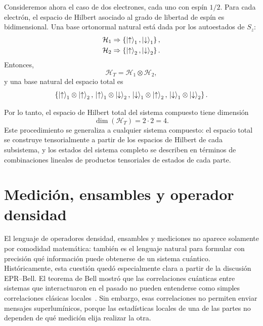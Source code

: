 \documentclass[12pt,a4paper]{article}
\theoremstyle{definition}
\theoremstyle{plain}
\theoremstyle{remark}
\newcommand{\Hil}{\mathcal{H}}
\begin{document}
Consideremos ahora el caso de dos electrones, cada uno con espín $1/2$. Para cada electrón, el espacio de Hilbert asociado al grado de libertad de espín es bidimensional. Una base ortonormal natural está dada por los autoestados de $S_z$:
\begin{align*}
    \Hil_1 &\Rightarrow \left\{\ket{\uparrow}_1,\ket{\downarrow}_1\right\},\\
    \Hil_2 &\Rightarrow \left\{\ket{\uparrow}_2,\ket{\downarrow}_2\right\}.
\end{align*}
Entonces,
\begin{equation*}
    \Hil_T=\Hil_1\otimes\Hil_2,
\end{equation*}
y una base natural del espacio total es
\begin{equation*}
    \left\{
        \ket{\uparrow}_1\otimes\ket{\uparrow}_2,\,
        \ket{\uparrow}_1\otimes\ket{\downarrow}_2,\,
        \ket{\downarrow}_1\otimes\ket{\uparrow}_2,\,
        \ket{\downarrow}_1\otimes\ket{\downarrow}_2
    \right\}.
\end{equation*}

Por lo tanto, el espacio de Hilbert total del sistema compuesto tiene dimensión
\begin{equation*}
    \dim(\Hil_T)=2\cdot 2=4.
\end{equation*}
Este procedimiento se generaliza a cualquier sistema compuesto: el espacio total se construye tensorialmente a partir de los espacios de Hilbert de cada subsistema, y los estados del sistema completo se describen en términos de combinaciones lineales de productos tensoriales de estados de cada parte.
\newpage


\section{Medición, ensambles y \textbf{operador densidad}}


El lenguaje de operadores densidad, ensambles y mediciones no aparece solamente por comodidad matemática: también es el lenguaje natural para formular con precisión qué información puede obtenerse de un sistema cuántico. Históricamente, esta cuestión quedó especialmente clara a partir de la discusión EPR--Bell. El teorema de Bell mostró que las correlaciones cuánticas entre sistemas que interactuaron en el pasado no pueden entenderse como simples correlaciones clásicas locales~\cite{Bell1964}. Sin embargo, esas correlaciones no permiten enviar mensajes superlumínicos, porque las estadísticas locales de una de las partes no dependen de qué medición elija realizar la otra.
\end{document}

